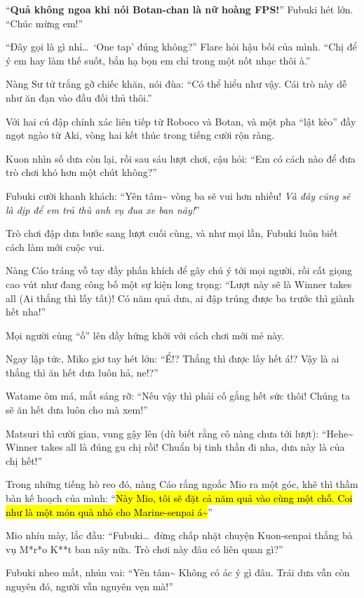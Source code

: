 \documentclass[../main.tex]{subfiles}
\begin{document}
``\textbf{Quả không ngoa khi nói Botan-chan là nữ hoàng FPS!}'' Fubuki hét lớn. ``Chúc mừng em!''

``Đây gọi là gì nhỉ\dots\ `One tap' đúng không?'' Flare hỏi hậu bối của mình. ``Chị để ý em hay làm thế suốt, bắn hạ bọn em chỉ trong một nốt nhạc thôi à.''

Nàng Sư tử trắng gỡ chiếc khăn, nói đùa: ``Có thể hiểu như vậy. Cái trò này dễ như ăn đạn vào đầu đối thủ thôi.''

Với hai cú đập chính xác liên tiếp từ Roboco và Botan, và một pha ``lật kèo'' đầy ngọt ngào từ Aki, vòng hai kết thúc trong tiếng cười rộn ràng.

Kuon nhìn số dưa còn lại, rồi sau sáu lượt chơi, cậu hỏi: ``Em có cách nào để đưa trò chơi khó hơn một chút không?''

Fubuki cười khanh khách: ``Yên tâm\~{} vòng ba sẽ vui hơn nhiều! \textit{Và đây cũng sẽ là dịp để em trả thù anh vụ đua xe ban nãy!}''

\ct

Trò chơi đập dưa bước sang lượt cuối cùng, và như mọi lần, Fubuki luôn biết cách làm mới cuộc vui.

Nàng Cáo tráng vỗ tay đầy phấn khích để gây chú ý tới mọi người, rồi cất giọng cao vút như đang công bố một sự kiện long trọng: ``Lượt này sẽ là Winner takes all (Ai thắng thì lấy tất)! Có năm quả dưa, ai đập trúng được ba trước thì giành hết nha!''

Mọi người cùng ``ồ'' lên đầy hứng khởi với cách chơi mới mẻ này.

Ngay lập tức, Miko giơ tay hét lớn: ``Ể!? Thắng thì được lấy hết á!? Vậy là ai thắng thì ăn hết dưa luôn hả, ne!?''

Watame ôm má, mắt sáng rỡ: ``Nếu vậy thì phải cố gắng hết sức thôi! Chúng ta sẽ ăn hết dưa luôn cho mà xem!''

Matsuri thì cười gian, vung gậy lên (dù biết rằng cô nàng chưa tới lượt): ``Hehe\~{} Winner takes all là đúng gu chị rồi! Chuẩn bị tinh thần đi nha, dưa này là của chị hết!''

Trong những tiếng hò reo đó, nàng Cáo rắng ngoắc Mio ra một góc, khẽ thì thầm bàn kế hoạch của mình: ``\hl{Này Mio, tôi sẽ đặt cả năm quả vào cùng một chỗ. Coi như là một món quà nhỏ cho Marine-senpai á\~{}}''

Mio nhíu mày, lắc đầu: ``Fubuki\dots\ đừng chấp nhặt chuyện Kuon-senpai thắng bà vụ M*r*o K**t ban nãy nữa. Trò chơi này đâu có liên quan gì?''

Fubuki nheo mắt, nhún vai: ``Yên tâm\~{} Không có ác ý gì đâu. Trái dưa vẫn còn nguyên đó, người vẫn nguyên vẹn mà!''
\end{document}
